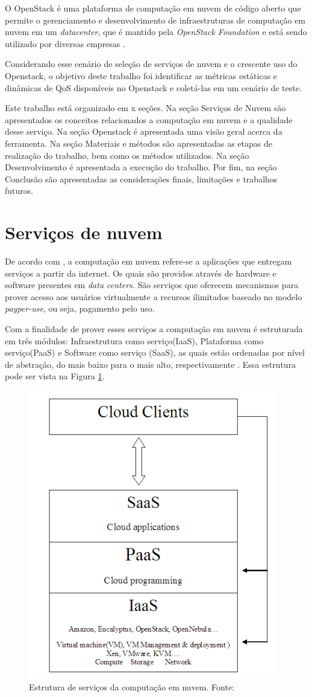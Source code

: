 \documentclass[conference]{IEEEtran}
\begin{document}
O OpenStack \cite{openstack_general} é uma plataforma de computação em nuvem de código aberto que permite o gerenciamento e desenvolvimento 
de infraestruturas de computação em nuvem em um \textit{datacenter}, que é mantido pela 
\textit{OpenStack Foundation} e está sendo utilizado por diversas empresas \cite{openstack} \cite{bui2016}.

Considerando esse cenário de seleção de serviços de nuvem e o crescente uso do Openstack, o objetivo deste trabalho foi identificar as métricas estáticas e dinâmicas de QoS disponíveis no Openstack e coletá-las em um cenário de teste.

Este trabalho está organizado em x seções. 
Na seção Serviços de Nuvem são apresentados os conceitos relacionados a computação em nuvem e a qualidade desse serviço. 
Na seção Openstack é apresentada uma visão geral acerca da ferramenta.
Na seção Materiais e métodos são apresentadas as etapas de realização do trabalho, bem como os métodos utilizados. 
Na seção Desenvolvimento é apresentada a execução do trabalho.
Por fim, na seção Conclusão são apresentadas as considerações finais, limitações e trabalhos futuros.


\section{Serviços de nuvem}
De acordo com , a computação em nuvem refere-se a aplicações que entregam serviços a partir da internet. 
Os quais são providos através de hardware e software presentes em \textit{data centers}. São serviços que oferecem mecanismos
para prover acesso aos usuários virtualmente a recursos ilimitados baseado no modelo \textit{payper-use}, ou seja, pagamento
pelo uso. \cite{sefraoui2012openstack}

Com a finalidade de prover esses serviços a computação em nuvem é estruturada em três módulos: Infraestrutura como serviço(IaaS),
Plataforma como serviço(PaaS) e Software como serviço (SaaS), as quais estão ordenadas por nível de abstração, do mais baixo 
para o mais alto, respectivamente \cite{rehman2011teaching, sefraoui2012openstack, armbrust2010view, mell2011nist}. 
Essa estrutura pode ser vista na Figura \ref{fig:cloud_structure}.

\begin{figure}[ht]
\centering
\includegraphics[width=.3\textwidth]{figuras/cloud_structure.png}
\caption{Estrutura de serviços da computação em nuvem. Fonte: \cite{sefraoui2012openstack}}
\label{fig:cloud_structure}
\end{figure}
\end{document}
